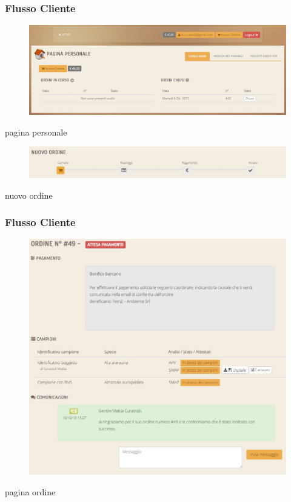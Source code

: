 \documentclass{beamer}
\begin{document}
\begin{frame}
 \frametitle{Flusso Cliente}
 \begin{center}
  \begin{figure}
    \includegraphics[scale=0.2]{images/cl-pagina-personale}
  \end{figure} 
  pagina personale
  \begin{figure}
    \includegraphics[scale=0.2]{images/cl-nuovo-ordine-bar}
  \end{figure} 
  nuovo ordine
 \end{center}
\end{frame}

\begin{frame}
 \frametitle{Flusso Cliente}
 \begin{center}
  \begin{figure}
    \includegraphics[scale=0.2]{images/cl-ordine}
  \end{figure} 
  pagina ordine
 \end{center}
\end{frame}
\end{document}
